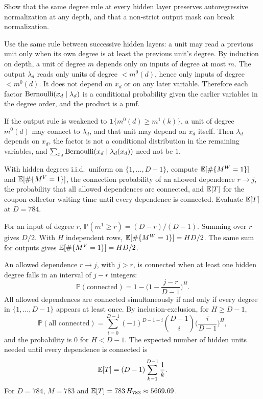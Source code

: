 \begin{hwqbox}
Show that the same degree rule at every hidden layer preserves autoregressive normalization at any depth, and that a non-strict output mask can break normalization.
\end{hwqbox}
\begin{hwsolbox}
Use the same rule between successive hidden layers: a unit may read a previous unit only when its own degree is at least the previous unit's degree. By induction on depth, a unit of degree $m$ depends only on inputs of degree at most $m$. The output $\lambda_d$ reads only units of degree $<m^0(d)$, hence only inputs of degree $<m^0(d)$. It does not depend on $x_d$ or on any later variable. Therefore each factor $\mathrm{Bernoulli}(x_d\mid\lambda_d)$ is a conditional probability given the earlier variables in the degree order, and the product is a pmf.

If the output rule is weakened to $\mathbf 1\{m^0(d)\ge m^1(k)\}$, a unit of degree $m^0(d)$ may connect to $\lambda_d$, and that unit may depend on $x_d$ itself. Then $\lambda_d$ depends on $x_d$, the factor is not a conditional distribution in the remaining variables, and $\sum_{x_d}\mathrm{Bernoulli}(x_d\mid\lambda_d(x_d))$ need not be $1$.
\end{hwsolbox}

\begin{hwqbox}
With hidden degrees i.i.d.\ uniform on $\{1,\ldots,D-1\}$, compute $\mathbb{E}[\#\{M^W=1\}]$ and $\mathbb{E}[\#\{M^V=1\}]$, the connection probability of an allowed dependence $r\to j$, the probability that all allowed dependences are connected, and $\mathbb{E}[T]$ for the coupon-collector waiting time until every dependence is connected. Evaluate $\mathbb{E}[T]$ at $D=784$.
\end{hwqbox}
\begin{hwsolbox}
For an input of degree $r$, $\mathbb P(m^1\ge r)=(D-r)/(D-1)$. Summing over $r$ gives $D/2$. With $H$ independent rows, $\mathbb{E}[\#\{M^W=1\}]=HD/2$. The same sum for outputs gives $\mathbb{E}[\#\{M^V=1\}]=HD/2$.

An allowed dependence $r\to j$, with $j>r$, is connected when at least one hidden degree falls in an interval of $j-r$ integers:
\[
\mathbb P(\text{connected})=1-\Big(1-\frac{j-r}{D-1}\Big)^H.
\]
All allowed dependences are connected simultaneously if and only if every degree in $\{1,\ldots,D-1\}$ appears at least once. By inclusion-exclusion, for $H\ge D-1$,
\[
\mathbb P(\text{all connected})
=\sum_{i=0}^{D-1}(-1)^{D-1-i}\binom{D-1}{i}\Big(\frac{i}{D-1}\Big)^H,
\]
and the probability is $0$ for $H<D-1$. The expected number of hidden units needed until every dependence is connected is
\[
\mathbb{E}[T]=(D-1)\sum_{k=1}^{D-1}\frac1k.
\]
For $D=784$, $M=783$ and $\mathbb{E}[T]=783\,H_{783}\approx 5669.69$.
\end{hwsolbox}

